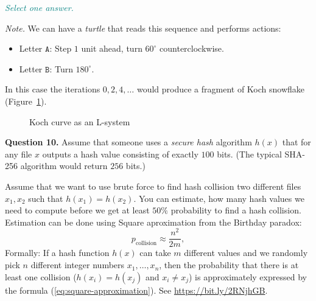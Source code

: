 \documentclass[jou]{apa6}
\begin{document}
\textcolor{teal}{\em Select one answer.}

{\em Note.} We can have a {\em turtle} that reads this 
sequence and performs actions:
\begin{itemize}
\item Letter $\mathtt{A}$: Step $1$ unit ahead, turn 
$60^{\circ}$ counterclockwise.
\item Letter $\mathtt{B}$: Turn $180^{\circ}$. 
\end{itemize}
In this case the iterations $0,2,4,\ldots$ would produce
a fragment of Koch snowflake (Figure~\ref{fig:lindenmayer-system}).

\begin{figure}[!htb]
\caption{\label{fig:lindenmayer-system} Koch curve as an L-system}
\end{figure}





\vspace{10pt}
{\bf Question 10.} Assume that someone uses
a {\em secure hash} algorithm $h(x)$ that for any file $x$
outputs a hash value consisting of exactly $100$
bits. (The typical SHA-256 algorithm would return $256$ bits.)

Assume that we want to use brute force to find 
hash collision \textendash{} two different files $x_1,x_2$
such that $h(x_1) = h(x_2)$. 
You can estimate, how many hash values we need to compute before we 
get at least $50\%$ probability to find a hash collision. 
Estimation can be done using Square aproximation from 
the Birthday paradox: 
\begin{equation}
\label{eq:square-approximation}
p_{\text{collision}} \approx \frac{n^2}{2m},
\end{equation}
Formally: If a hash function $h(x)$ can take $m$ different values and
we randomly pick $n$ different integer numbers $x_1,\ldots,x_n$, then the probability 
that there is at least one collision ($h(x_i) = h(x_j)$ and $x_i \neq x_j$) is approximately expressed by
the formula (\ref{eq:square-approximation}). See \url{https://bit.ly/2RNjhGB}.
\end{document}
